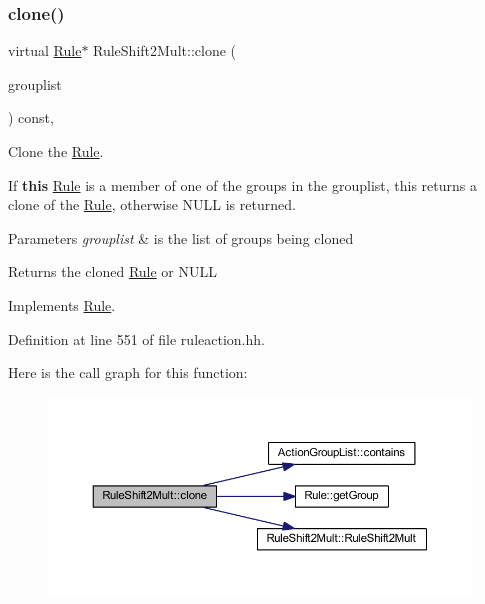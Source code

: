\subsubsection{\texorpdfstring{clone()}{clone()}}
{\footnotesize\ttfamily virtual \mbox{\hyperlink{class_rule}{Rule}}$\ast$ Rule\+Shift2\+Mult\+::clone (\begin{DoxyParamCaption}\item[{const \mbox{\hyperlink{class_action_group_list}{Action\+Group\+List}} \&}]{grouplist }\end{DoxyParamCaption}) const\hspace{0.3cm}{\ttfamily [inline]}, {\ttfamily [virtual]}}



Clone the \mbox{\hyperlink{class_rule}{Rule}}. 

If {\bfseries{this}} \mbox{\hyperlink{class_rule}{Rule}} is a member of one of the groups in the grouplist, this returns a clone of the \mbox{\hyperlink{class_rule}{Rule}}, otherwise N\+U\+LL is returned. 
\begin{DoxyParams}{Parameters}
{\em grouplist} & is the list of groups being cloned \\
\hline
\end{DoxyParams}
\begin{DoxyReturn}{Returns}
the cloned \mbox{\hyperlink{class_rule}{Rule}} or N\+U\+LL 
\end{DoxyReturn}


Implements \mbox{\hyperlink{class_rule_a70de90a76461bfa7ea0b575ce3c11e4d}{Rule}}.



Definition at line 551 of file ruleaction.\+hh.

Here is the call graph for this function\+:
\nopagebreak
\begin{figure}[H]
\begin{center}
\leavevmode
\includegraphics[width=350pt]{class_rule_shift2_mult_a26da49bb955581c220a082aae5e8f546_cgraph}
\end{center}
\end{figure}
\mbox{\label{class_rule_shift2_mult_aea2c1542a1d7c6e133e4340828fc6507}} 
